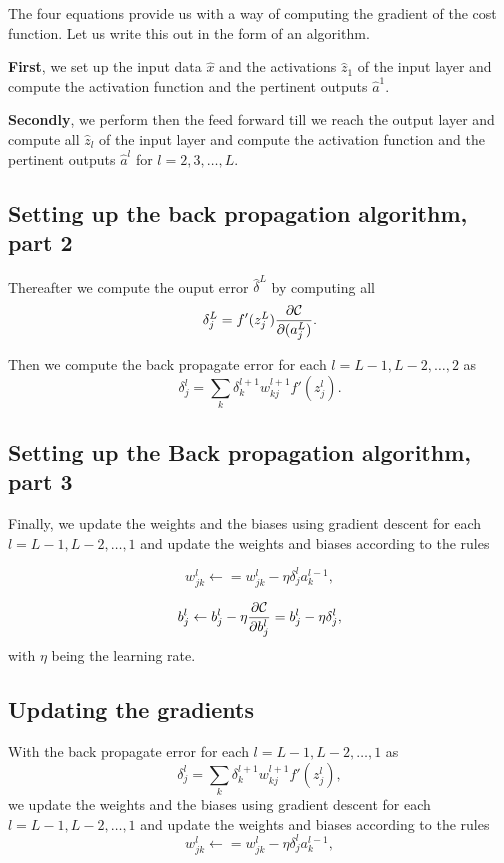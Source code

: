 \documentclass[%
oneside,                 %
final,                   %
10pt]{article}
\begin{document}
The four equations  provide us with a way of computing the gradient of the cost function. Let us write this out in the form of an algorithm.

\textbf{First}, we set up the input data $\hat{x}$ and the activations
$\hat{z}_1$ of the input layer and compute the activation function and
the pertinent outputs $\hat{a}^1$.

\textbf{Secondly}, we perform then the feed forward till we reach the output
layer and compute all $\hat{z}_l$ of the input layer and compute the
activation function and the pertinent outputs $\hat{a}^l$ for
$l=2,3,\dots,L$.

\subsection{Setting up the back propagation algorithm, part 2}

Thereafter we compute the ouput error $\hat{\delta}^L$ by computing all
\[
\delta_j^L = f'(z_j^L)\frac{\partial {\cal C}}{\partial (a_j^L)}.
\]

Then we compute the back propagate error for each $l=L-1,L-2,\dots,2$ as
\[
\delta_j^l = \sum_k \delta_k^{l+1}w_{kj}^{l+1}f'(z_j^l).
\]

\subsection{Setting up the Back propagation algorithm, part 3}

Finally, we update the weights and the biases using gradient descent
for each $l=L-1,L-2,\dots,1$ and update the weights and biases
according to the rules

\[
w_{jk}^l\leftarrow  = w_{jk}^l- \eta \delta_j^la_k^{l-1},
\]

\[
b_j^l \leftarrow b_j^l-\eta \frac{\partial {\cal C}}{\partial b_j^l}=b_j^l-\eta \delta_j^l,
\]
with $\eta$ being the learning rate.

\subsection{Updating the gradients}

With the back propagate error for each $l=L-1,L-2,\dots,1$ as
\[
\delta_j^l = \sum_k \delta_k^{l+1}w_{kj}^{l+1}f'(z_j^l),
\]
we update the weights and the biases using gradient descent for each $l=L-1,L-2,\dots,1$ and update the weights and biases according to the rules
\[
w_{jk}^l\leftarrow  = w_{jk}^l- \eta \delta_j^la_k^{l-1},
\]
\end{document}
